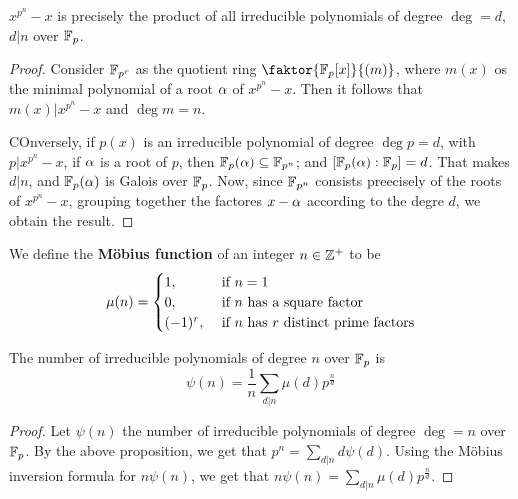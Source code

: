 \begin{proposition}\label{2.3.3}
    $x^{p^n}-x$ is precisely the product of all irreducible polynomials of
    degree $\deg=d$, $d|n$ over  $\mathbb{F}_p$.
\end{proposition}
\begin{proof}
    Consider $\mathbb{F}_{p^r}$ as the quotient ring $\faktor{\F_p[x]}{(m)}$, where
    $m(x)$ os the minimal polynomial of a root $\alpha$ of  $x^{p^n}-x$. Then it
    follows that $m(x)|x^{p^n}-x$ and $\deg{m}=n$.

    COnversely, if $p(x)$ is an irreducible polynomial of degree $\deg{p}=d$,
    with $p|x^{p^n}-x$, if $\alpha$ is a root of  $p$, then  $\mathbb{F}_p(\alpha) \subseteq
    \mathbb{F}_{p^n}$; and $[\mathbb{F}_p(\alpha) : \mathbb{F}_p]=d$. That makes $d|n$, and $\mathbb{F}_p(\alpha)$
    is Galois over $\mathbb{F}_p$. Now, since $\mathbb{F}_{p^n}$ consists preecisely of the
    roots of $x^{p^n}-x$, grouping together the factores $x-\alpha$ according to the
    degre $d$, we obtain the result.
\end{proof}

\begin{definition}
    We define the \textbf{M\"obius function} of an integer $n \in \mathbb{Z}^+$ to be
    \begin{equation*}
        \mu(n)=\begin{cases}
            1,  &   \text{ if } n=1 \\
            0,  &   \text{ if } n \text{ has a square factor} \\
            (-1)^r,  &   \text{ if } n \text{ has } r \text{ distinct prime
            factors} \\
        \end{cases}
    \end{equation*}
\end{definition}

\begin{theorem}\label{2.3.4}
    The number of irreducible polynomials of degree $n$ over  $\mathbb{F}_p$ is
    \begin{equation*}
        \psi(n)=\frac{1}{n}\sum_{d|n}{\mu(d)p^{\frac{n}{d}}}
    \end{equation*}
\end{theorem}
\begin{proof}
    Let $\psi(n)$ the number of irreducible polynomials of degree $\deg=n$ over
    $\mathbb{F}_p$. By the above proposition, we get that  $p^n=\sum_{d|n}{d\psi(d)}$. Using
    the M\"obius inversion formula for $n\psi(n)$, we get that
    $n\psi(n)=\sum_{d|n}{\mu(d)p^{\frac{n}{d}}}$.
\end{proof}
